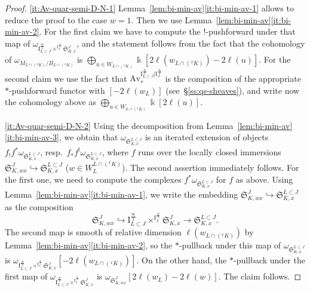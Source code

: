 \documentclass[11pt]{amsart}
\numberwithin{equation}{section}
\theoremstyle{plain}
\theoremstyle{definition}
\newcommand{\I}{{\mathrm I}}
\renewcommand{\k}{\Bbbk}
\newcommand{\semi}{{{\frac{\infty}{2}}}}
\newcommand{\quar}{{{\frac{\infty}{4}}}}
\newcommand{\Av}{\mathrm{Av}}
\newcommand{\rS}{\mathfrak{S}}
\begin{document}
\begin{proof}
\eqref{it:Av-quar-semi-D-N-1}
Lemma~\ref{lem:bi-min-av}\eqref{it:bi-min-av-1} allows to reduce the proof to the case $w=1$. Then we use Lemma~\ref{lem:bi-min-av}\eqref{it:bi-min-av-2}. For the first claim we have to compute the $!$-pushforward under that map of $\omega_{\I_{L \subset J}^\semi \times^{\I_J^\quar} \rS_{K,x}^{J}}$, and the statement follows from the fact that the cohomology of $\omega_{M_{L \cap ({}^x K)}/B_{L \cap ({}^x K)}}$ is $\bigoplus_{u \in W_{L \cap ({}^x K)}} \k[2\ell(w_{L \cap ({}^x K)}) - 2\ell(u)]$. For the second claim we use the fact that $\Av_*^{\I_{L \subset J}^{\semi}|\I_J^{\quar}}$ is the composition of the appropriate $*$-pushforward functor with 
$[-2\ell(w_L)]$ (see~\S\ref{ss:qs-sheaves}), and write now the cohomology above as $\bigoplus_{u \in W_{L \cap ({}^x K)}} \k[2\ell(u)]$.

\eqref{it:Av-quar-semi-D-N-2}
Using the decomposition from Lemma~\ref{lem:bi-min-av}\eqref{it:bi-min-av-3}, we obtain that $\omega_{\rS^{L \subset J}_{K,x}}$ is an iterated extension of objects $f_! f^* \omega_{\rS^{L \subset J}_{K,x}}$, resp.~$f_* f^! \omega_{\rS^{L \subset J}_{K,x}}$, where $f$ runs over the locally closed immersions $\rS^{J}_{K,wx} \hookrightarrow \rS^{L \subset J}_{K,x}$ ($w \in W_L^{L \cap ({}^xK)}$). The second assertion immediately follows. For the first one, we need to compute the complexes $f^* \omega_{\rS^{L \subset J}_{K,x}}$ for $f$ as above.
Using Lemma~\ref{lem:bi-min-av}\eqref{it:bi-min-av-1},
we write the embedding $\rS^{J}_{K,wx} \hookrightarrow \rS^{L \subset J}_{K,x}$ as the composition
\[
\rS^{J}_{K,wx} \hookrightarrow \I_{L \subset J}^\semi \times^{\I_J^\quar} \rS_{K,x}^J \to \rS^{L \subset J}_{K,x}.
\]
The second map is smooth of relative dimension $\ell(w_{L \cap ({}^x K)})$ by Lemma~\ref{lem:bi-min-av}\eqref{it:bi-min-av-2}, so the $*$-pullback under this map of $\omega_{\rS^{L \subset J}_{K,x}}$ is $\omega_{\I_{L \subset J}^\semi \times^{\I_J^\quar} \rS_{K,x}^J}[-2\ell(w_{L \cap ({}^x K)})]$. On the other hand, the $*$-pullback under the first map of $\omega_{\I_{L \subset J}^\semi \times^{\I_J^\quar} \rS_{K,x}^J}$ is $\omega_{\rS^{J}_{K,wx}}[2\ell(w_L)-2\ell(w)]$. The claim follows.
\end{proof}
\end{document}
